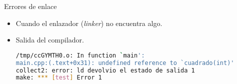 \begin{frame}[fragile]{Errores de enlace}
\begin{itemize}
  \item Cuando el enlazador (\emph{linker}) no encuentra algo.

  \item Salida del compilador.
\begin{lstlisting}[language=bash,basicstyle=\scriptsize\ttfamily]
/tmp/ccGYMTH0.o: In function `main':
main.cpp:(.text+0x31): undefined reference to `cuadrado(int)'
collect2: error: ld devolvio el estado de salida 1
make: *** [test] Error 1
\end{lstlisting}
\end{itemize}
\end{frame}

